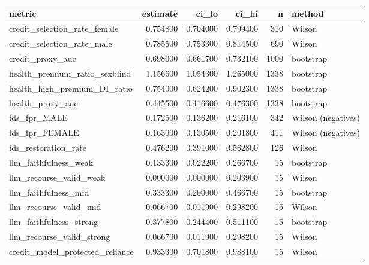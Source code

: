 \begin{tabular}{lrrrrl}
\toprule
metric & estimate & ci_lo & ci_hi & n & method \\
\midrule
credit_selection_rate_female & 0.754800 & 0.704000 & 0.799400 & 310 & Wilson \\
credit_selection_rate_male & 0.785500 & 0.753300 & 0.814500 & 690 & Wilson \\
credit_proxy_auc & 0.698000 & 0.661700 & 0.732100 & 1000 & bootstrap \\
health_premium_ratio_sexblind & 1.156600 & 1.054300 & 1.265000 & 1338 & bootstrap \\
health_high_premium_DI_ratio & 0.754000 & 0.624200 & 0.902300 & 1338 & bootstrap \\
health_proxy_auc & 0.445500 & 0.416600 & 0.476300 & 1338 & bootstrap \\
fds_fpr_MALE & 0.172500 & 0.136200 & 0.216100 & 342 & Wilson (negatives) \\
fds_fpr_FEMALE & 0.163000 & 0.130500 & 0.201800 & 411 & Wilson (negatives) \\
fds_restoration_rate & 0.476200 & 0.391000 & 0.562800 & 126 & Wilson \\
llm_faithfulness_weak & 0.133300 & 0.022200 & 0.266700 & 15 & bootstrap \\
llm_recourse_valid_weak & 0.000000 & 0.000000 & 0.203900 & 15 & Wilson \\
llm_faithfulness_mid & 0.333300 & 0.200000 & 0.466700 & 15 & bootstrap \\
llm_recourse_valid_mid & 0.066700 & 0.011900 & 0.298200 & 15 & Wilson \\
llm_faithfulness_strong & 0.377800 & 0.244400 & 0.511100 & 15 & bootstrap \\
llm_recourse_valid_strong & 0.066700 & 0.011900 & 0.298200 & 15 & Wilson \\
credit_model_protected_reliance & 0.933300 & 0.701800 & 0.988100 & 15 & Wilson \\
\bottomrule
\end{tabular}
